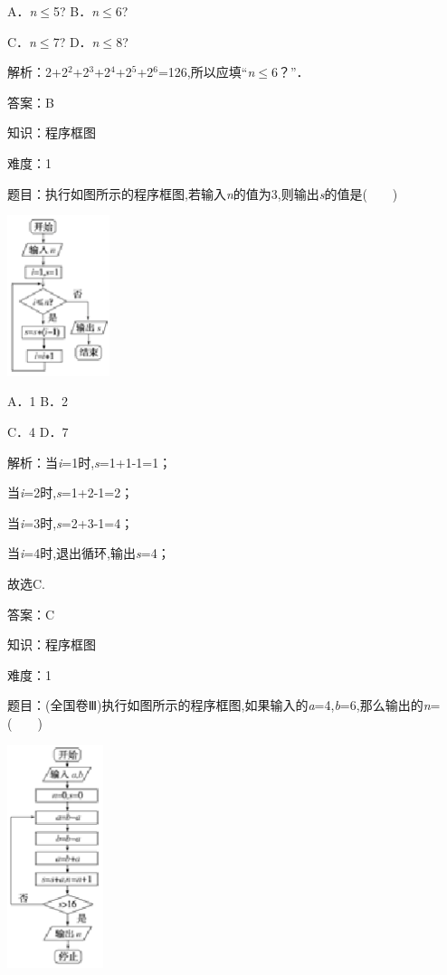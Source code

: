 \documentclass{article} %
\begin{document}
A．\textit{n}$\mathrm{\le}$5?  B．\textit{n}$\mathrm{\le}$6?

C．\textit{n}$\mathrm{\le}$7?  D．\textit{n}$\mathrm{\le}$8?

解析：2+2${}^{2}$+2${}^{3}$+2${}^{4}$+2${}^{5}$+2${}^{6}$=126,所以应填``\textit{n}$\mathrm{\le}$6？''．

答案：B

知识：程序框图

难度：1

题目：执行如图所示的程序框图,若输入\textit{n}的值为3,则输出\textit{s}的值是(　　)

\includegraphics*[width=1.18in, height=1.85in, keepaspectratio=false]{image17}

A．1  B．2

C．4  D．7

解析：当\textit{i}=1时,\textit{s}=1+1-1=1；

当\textit{i}=2时,\textit{s}=1+2-1=2；

当\textit{i}=3时,\textit{s}=2+3-1=4；

当\textit{i}=4时,退出循环,输出\textit{s}=4；

故选C.

答案：C

知识：程序框图

难度：1

题目：(全国卷Ⅲ)执行如图所示的程序框图,如果输入的\textit{a}=4,\textit{b}=6,那么输出的\textit{n}=(　　)

\includegraphics*[width=1.10in, height=2.58in, keepaspectratio=false]{image18}
\end{document}
